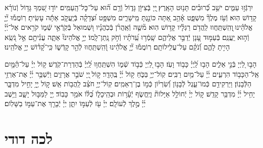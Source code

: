 \documentclass[twoside, openany, parskip=half, 11pt]{book}
\begin{document}
יִרְגְּֿז֣וּ עַמִּ֑ים ישֵׁ֥ב כְּֿ֝רוּבִ֗ים תָּנ֥וּט הָאָֽרֶץ׃
֖יְיָ בְּֿצִיּוֹ֣ן גָּד֑וֹל וְֿרָ֥ם ה֝֗וּא עַל־כׇּל־הָֽעַמִּֽים׃
יוֹד֣וּ שִׁ֭מְךָ גָּד֥וֹל וְֿנוֹרָ֗א קָד֥וֹשׁ הֽוּא׃
וְֿעֹ֥ז מֶלֶךְ֘ מִשְׁפָּ֢ט אָ֫הֵ֥ב אַ֭תָּה כּוֹנַ֣נְתָּ מֵּֽישָׁרִ֑ים מִשְׁפָּ֥ט וּ֝צְדָקָ֗ה בְּֿיַֽעֲקֹ֤ב אַתָּ֬ה עָשִֽׂיתָ׃
רֽוֹמֲמ֡וּ יְ֘יָ֤ אֱלֹהֵ֗ינוּ ֖וְהִֽשְׁתַּֽחֲווּ לַֽהֲדֹ֥ם רַגְלָ֗יו קָד֥וֹשׁ הֽוּא׃
מ֘שֶׁ֤ה וְֿאַֽהֲרֹ֨ן בְּֿכֹֽהֲנָ֗יו וּ֭שְׁמוּאֵל בְּֿקֹֽרְֿאֵ֣י שְֿׁמ֑וֹ קֹרִ֥אים אֶל־יְ֜יָ֗ וְֿה֣וּא יַֽעֲנֵֽם׃
בְּֿעַמּ֣וּד עָ֭נָן יְֿדַבֵּ֣ר אֲלֵיהֶ֑ם שָֽׁמְֿר֥וּ עֵֽ֝דֹתָ֗יו וְֿחֹ֣ק נָֽתַן־לָֽמוֹ׃
יְיָ֣ אֱלֹהֵינוּ֘ אַתָּ֢ה עֲנִ֫יתָ֥ם אֵ֣ל נֹ֭שֵֽׂא הָיִ֣יתָ לָהֶ֑ם וְֿ֝נֹקֵ֗ם עַל־עֲלִֽילוֹתָֽם׃
רֽוֹמֲמ֡וּ יְ֘יָ֤ אֱלֹהֵ֗ינוּ וְֿ֭הִֽשְׁתַּֽחֲווּ לְֿהַ֣ר קָדְֿשׁ֑וֹ כִּֽי־קָ֝ד֗וֹשׁ יְיָ֥ אֱלֹהֵֽינוּ׃

הָב֣וּ לַ֭יְיָ בְּֿנֵ֣י אֵלִ֑ים הָב֥וּ לַֽ֝יְיָ֗ כָּב֥וֹד וָעֹֽז׃
הָב֣וּ לַ֭יְיָ כְּֿב֣וֹד שְֿׁמ֑וֹ הִשְׁתַּֽחֲו֥וּ לַֽ֝יְיָ֗ בְּֿהַדְרַת־קֹֽדֶשׁ׃
ק֥וֹל יְיָ֗ עַל־הַ֫מָּ֥יִם אֵֽל־הַכָּב֥וֹד הִרְעִ֑ים יְ֜יָ֗ עַל־מַ֥יִם רַבִּֽים׃
קֽוֹל־יְיָ֥ בַּכֹּ֑חַ ק֥וֹל יְ֜יָ֗ בֶּֽהָדָֽר׃
ק֣וֹל ֖יְיָ שֹׁבֵ֣ר אֲרָזִ֑ים וַיְֿשַׁבֵּ֥ר יְ֜יָ֗ אֶת־אַרְזֵ֥י הַלְּֿבָנֽוֹן׃
וַיַּרְקִידֵ֥ם כְּֿמוֹ־עֵ֑גֶל לְֿבָנ֥וֹן וְֿ֝שִׂרְי֗וֹן כְּֿמ֣וֹ בֶן־רְאֵמִֽים׃
קֽוֹל־יְיָ֥ חֹצֵ֗ב לַֽהֲב֥וֹת אֵֽשׁ׃
ק֣וֹל יְ֖יָ֥ יָחִ֣יל מִדְבָּ֑ר יָחִ֥יל יְ֜יָ֗ מִדְבַּ֥ר קָדֵֽשׁ׃
ק֣וֹל יְיָ֨ יְֿחוֹלֵ֣ל אַיָּלוֹת֘ וַיֶּֽחֱשׂ֢ף יְֿעָ֫ר֥וֹת וּבְהֵֽיכָל֑וֹ כֻּ֝לּ֗וֹ אֹמֵ֥ר כָּבֽוֹד׃
יְ֖יָ לַמַּבּ֣וּל יָשָׁ֑ב וַיֵּ֥שֶׁב יְ֜יָ֗ מֶ֣לֶךְ לְֿעוֹלָֽם׃
יְיָ֗ עֹ֖ז לְֿעַמּ֣וֹ יִתֵּ֑ן יְיָ֓ יְֿבָרֵ֖ךְ אֶת־עַמּ֣וֹ בַשָּׁלֽוֹם׃


\section*{ לכה דודי }

\newcommand{\lechadodi}{\textbf{לְכָה דוֹדִי לִקְרַאת כַּלָּה פְּֿנֵי שַׁבָּת נְֿקַבְּֿלָה:}}
\end{document}
